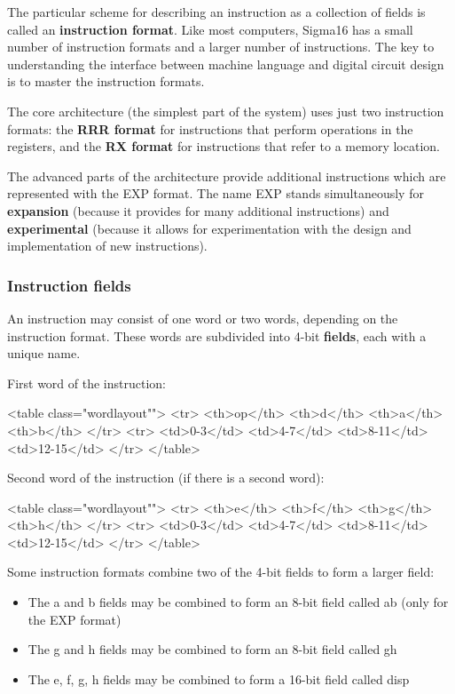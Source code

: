 \documentclass[11pt]{article}
\begin{document}
The particular scheme for describing an instruction as a collection of
fields is called an \textbf{instruction format}.  Like most computers,
Sigma16 has a small number of instruction formats and a larger number of
instructions.  The key to understanding the interface between machine
language and digital circuit design is to master the instruction
formats.

The core architecture (the simplest part of the system) uses just two
instruction formats: the \textbf{\textbf{RRR format}} for instructions that perform
operations in the registers, and the \textbf{\textbf{RX format}} for instructions
that refer to a memory location.

The advanced parts of the architecture provide additional instructions
which are represented with the EXP format. The name EXP stands
simultaneously for \textbf{expansion} (because it provides for many
additional instructions) and \textbf{experimental} (because it allows for
experimentation with the design and implementation of new
instructions).

\subsubsection*{Instruction fields}
\label{sec:orgb851fdf}

An instruction may consist of one word or two words, depending on the
instruction format.  These words are subdivided into 4-bit \textbf{fields},
each with a unique name.

First word of the instruction:

<table class="wordlayout"">
<tr>
<th>op</th>
<th>d</th>
<th>a</th>
<th>b</th>
</tr>
<tr>
<td>0-3</td>
<td>4-7</td>
<td>8-11</td>
<td>12-15</td>
</tr>
</table>

Second word of the instruction (if there is a second word):

<table class="wordlayout"">
  <tr>
    <th>e</th>
    <th>f</th>
    <th>g</th>
    <th>h</th>
  </tr>
  <tr>
    <td>0-3</td>
    <td>4-7</td>
    <td>8-11</td>
    <td>12-15</td>
  </tr>
</table>

Some instruction formats combine two of the 4-bit fields to form a
larger field:

\begin{itemize}
\item The a and b fields may be combined to form an 8-bit field called ab
(only for the EXP format)
\item The g and h fields may be combined to form an 8-bit field called gh
\item The e, f, g, h fields may be combined to form a 16-bit field called
disp
\end{itemize}
\end{document}

